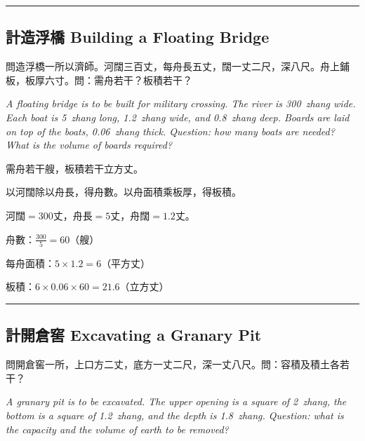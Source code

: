 \documentclass[11pt,a4paper]{article}
\newcommand{\longline}{\noindent\rule{\textwidth}{0.4pt}}
\begin{document}
\vspace{0.5em}
\longline

\subsection{計造浮橋 \quad Building a Floating Bridge}

\begin{problem}
問造浮橋一所以濟師。河闊三百丈，每舟長五丈，闊一丈二尺，深八尺。舟上鋪板，板厚六寸。問：需舟若干？板積若干？

\textit{A floating bridge is to be built for military crossing. The river is 300~zhang wide. Each boat is 5~zhang long, 1.2~zhang wide, and 0.8~zhang deep. Boards are laid on top of the boats, 0.06~zhang thick. Question: how many boats are needed? What is the volume of boards required?}
\end{problem}

\begin{answer}
需舟若干艘，板積若干立方丈。
\end{answer}

\begin{method}
以河闊除以舟長，得舟數。以舟面積乘板厚，得板積。
\end{method}

\begin{working}
河闊$=300$丈，舟長$=5$丈，舟闊$=1.2$丈。

舟數：$\displaystyle\frac{300}{5} = 60$（艘）

每舟面積：$5 \times 1.2 = 6$（平方丈）

板積：$6 \times 0.06 \times 60 = 21.6$（立方丈）
\end{working}

\vspace{0.5em}
\longline

\subsection{計開倉窖 \quad Excavating a Granary Pit}

\begin{problem}
問開倉窖一所，上口方二丈，底方一丈二尺，深一丈八尺。問：容積及積土各若干？

\textit{A granary pit is to be excavated. The upper opening is a square of 2~zhang, the bottom is a square of 1.2~zhang, and the depth is 1.8~zhang. Question: what is the capacity and the volume of earth to be removed?}
\end{problem}
\end{document}
